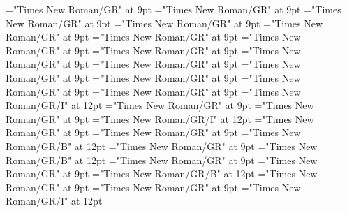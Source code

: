 \documentclass[gps1,twoside]{article}
\begin{document}
\font\spanreverseabbrvariantentrytypevariantentrytypesvariantformentrybackrefvariantformentrybackrefsentrylastchildafter="Times New Roman/GR" at 9pt
\font\spanspanheadwordvariantformentrybackrefvariantformentrybackrefsentrybefore="Times New Roman/GR" at 9pt
\font\spanspanowningentrysummarydefinitionvariantformentrybackrefvariantformentrybackrefsentrybefore="Times New Roman/GR" at 9pt
\font\spanowningentrysummarydefinitionvariantformentrybackrefvariantformentrybackrefsentrylastchildafter="Times New Roman/GR" at 9pt
\font\etymologyentrybefore="Times New Roman/GR" at 9pt
\font\etymologyentryafter="Times New Roman/GR" at 9pt
\font\spanspanformetymologyentrybefore="Times New Roman/GR" at 9pt
\font\spanformetymologyentrylastchildafter="Times New Roman/GR" at 9pt
\font\spanspanglossetymologyentrybefore="Times New Roman/GR" at 9pt
\font\spanglossetymologyentrylastchildafter="Times New Roman/GR" at 9pt
\font\spanspancommentetymologyentrybefore="Times New Roman/GR" at 9pt
\font\spancommentetymologyentrylastchildafter="Times New Roman/GR" at 9pt
\font\spanspanminimallexreferencesentrybefore="Times New Roman/GR" at 9pt
\font\minimallexreferencesentryafter="Times New Roman/GR" at 9pt
\font\spanenownertypeabbreviationminimallexreferenceminimallexreferencesentry="Times New Roman/GR/I" at 12pt
\font\spanspanownertypeabbreviationminimallexreferenceminimallexreferencesentrybefore="Times New Roman/GR" at 9pt
\font\spanownertypeabbreviationminimallexreferenceminimallexreferencesentrylastchildafter="Times New Roman/GR" at 9pt
\font\spanownertypeabbreviationminimallexreferenceminimallexreferencesentry="Times New Roman/GR/I" at 12pt
\font\configtargetconfigtargetconfigtargetsminimallexreferenceminimallexreferencesentrybefore="Times New Roman/GR" at 9pt
\font\configtargetsminimallexreferenceminimallexreferencesentryafter="Times New Roman/GR" at 9pt
\font\spanbzhheadwordconfigtargetconfigtargetsminimallexreferenceminimallexreferencesentry="Times New Roman/GR/B" at 12pt
\font\spanspanheadwordconfigtargetconfigtargetsminimallexreferenceminimallexreferencesentrybefore="Times New Roman/GR" at 9pt
\font\spanheadwordconfigtargetconfigtargetsminimallexreferenceminimallexreferencesentry="Times New Roman/GR/B" at 12pt
\font\spanspansensecontentspansensesentrybefore="Times New Roman/GR" at 9pt
\font\sensesentryafter="Times New Roman/GR" at 9pt
\font\sensenumbersensecontentsensesentry="Times New Roman/GR/B" at 12pt
\font\sensenumbersensecontentsensesentryafter="Times New Roman/GR" at 9pt
\font\morphosyntaxanalysissharedgrammaticalinfosensesentryafter="Times New Roman/GR" at 9pt
\font\morphosyntaxanalysissharedgrammaticalinfosensesentry="Times New Roman/GR/I" at 12pt
\end{document}
